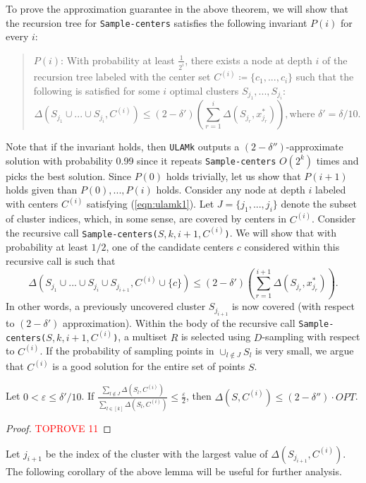 \documentclass[11pt]{llncs}
\newcommand{\veps}{\varepsilon}
\begin{document}
To prove the approximation guarantee in the above theorem, we will show that the recursion tree for {\tt Sample-centers} satisfies the following invariant $P(i)$ for every $i$:
\begin{quote}
$P(i)$: With probability at least $\frac{1}{2^i}$, there exists a node at depth $i$ of the recursion tree labeled with the center set $C^{(i)} \coloneqq \{c_1, ..., c_i\}$ such that the following is satisfied for some $i$ optimal clusters $S_{j_1}, ..., S_{j_i}$:
\begin{equation}\label{eqn:ulamk1}
\Delta(S_{j_1}\cup ... \cup S_{j_i}, C^{(i)}) \leq (2 - \delta') \left(\sum_{r=1}^{i} \Delta(S_{j_r}, x^*_{j_r}) \right), \textrm{where $\delta' = \delta/10$} .
\end{equation}
\end{quote}
Note that if the invariant holds, then {\tt ULAMk} outputs a $(2 - \delta'')$-approximate solution with probability 0.99 since it repeats {\tt Sample-centers} $O(2^k)$ times and picks the best solution. Since $P(0)$ holds trivially, let us show that $P(i+1)$ holds given than $P(0), ..., P(i)$ holds. Consider any node at depth $i$ labeled with centers $C^{(i)}$ satisfying (\ref{eqn:ulamk1}). 
Let $J = \{j_{1}, ..., j_{i}\}$ denote the subset of cluster indices, which, in some sense, are covered by centers in $C^{(i)}$.
Consider the recursive call {\tt Sample-centers($S, k, i+1, C^{(i)}$)}. We will show that with probability at least $1/2$, one of the candidate centers $c$ considered within this recursive call is such that
$$
\Delta(S_{j_1}\cup ... \cup S_{j_i} \cup S_{j_{i+1}}, C^{(i)} \cup \{c\}) \leq (2-\delta') \left(\sum_{r=1}^{i+1} \Delta(S_{j_r}, x^*_{j_r}) \right).
$$
In other words, a previously uncovered cluster $S_{j_{i+1}}$ is now covered (with respect to $(2-\delta')$ approximation).
Within the body of the recursive call {\tt Sample-centers($S, k, i+1, C^{(i)}$)}, a multiset $R$ is selected using $D$-sampling with respect to $C^{(i)}$. 
If the probability of sampling points in $\cup_{l \notin J} S_{l}$ is very small, we argue that $C^{(i)}$ is a good solution for the entire set of points $S$.

\begin{lemma}
Let $0 < \veps \leq \delta'/10$. If $\frac{\sum_{l \notin J} \Delta(S_l, C^{(i)})}{\sum_{l \in [k]} \Delta(S_l, C^{(i)})} \leq \frac{\veps}{2}$, then $\Delta(S, C^{(i)}) \leq (2-\delta'') \cdot OPT$.
\end{lemma}
\begin{proof}\textcolor{red}{TOPROVE 11}\end{proof}
Let $j_{i+1}$ be the index of the cluster with the largest value of $\Delta(S_{j_{i+1}}, C^{(i)})$.
The following corollary of the above lemma will be useful for further analysis.
\end{document}
